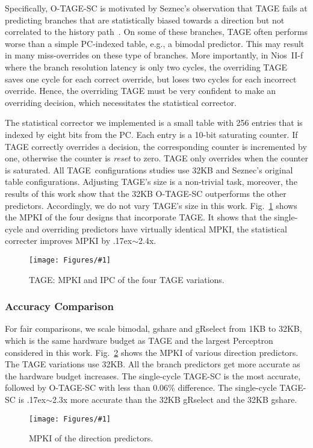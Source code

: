 \documentclass[conference]{IEEEtran}
\newcommand{\mytilde}{{\raise.17ex\hbox{$\scriptstyle\sim$}}}
\newcommand{\kfig}[4]{ %
        \begin{figure}[!t]
        \centering
        \texttt{[image: Figures/\#1]}
        \vspace{-1mm}
        \caption{#3}
        \label{#2}
        \end{figure}
}
\begin{document}
Specifically, \mbox{O-TAGE-SC} is motivated by Seznec's observation that TAGE fails at predicting branches that are statistically biased towards a direction but not correlated to the history path~\cite{isltage}. On some of these branches, TAGE often performs worse than a simple PC-indexed table, e.g., a bimodal predictor. This may result in many miss-overrides on these type of branches. More importantly, in Nios~II-f where the branch resolution latency is only two cycles, the overriding TAGE saves one cycle for each correct override, but loses two cycles for each incorrect override. 
Hence, the overriding TAGE must be very confident to make an overriding decision, which necessitates the statistical corrector.

The statistical corrector we implemented is a small table with 256 entries that is indexed by eight bits from the PC. Each entry is a 10-bit saturating counter. If TAGE correctly overrides a decision, the corresponding counter is incremented by one, otherwise the counter is \textit{reset} to zero. TAGE only overrides when the counter is saturated.
All TAGE\ configurations studies use 32KB and Seznec's original table configurations. Adjusting TAGE's size is a non-trivial task, moreover, the results of this work show that the 32KB \mbox{O-TAGE-SC} outperforms the other predictors. Accordingly, we do not vary TAGE's size in this work. Fig.~\ref{fig:tageMPKI} shows the MPKI of the four designs that incorporate TAGE. It shows that the single-cycle and overriding predictors have virtually identical MPKI, the statistical correcter improves MPKI by \mytilde 2.4x.
\kfig{tageMPKI.pdf}{fig:tageMPKI}{TAGE: MPKI and IPC of the four TAGE variations.}{angle = 0, trim = 0.7in 2.6in 1in 2.7in, clip, width=0.35\textwidth}



\subsubsection{Accuracy Comparison}
\label{sec:eval:accuracy:comparison}
For fair comparisons, we scale bimodal, gshare and gRselect from 1KB to 32KB, which is the same hardware budget as TAGE and the largest Perceptron considered in this work. Fig.~\ref{fig:admpki} shows the MPKI of various direction predictors. The TAGE variations use 32KB. All the branch predictors get more accurate as the hardware budget increases. The single-cycle \mbox{TAGE-SC} is the most accurate, followed by \mbox{O-TAGE-SC} with less than 0.06\% difference. The single-cycle \mbox{TAGE-SC} is \mytilde 2.3x more accurate than the 32KB gRselect and the 32KB gshare.
\kfig{admpki.pdf}{fig:admpki}{MPKI of the direction predictors.}{angle = 0, trim = 0.9in 2.7in 0.8in 2.7in, clip, width=0.5\textwidth}
\end{document}
